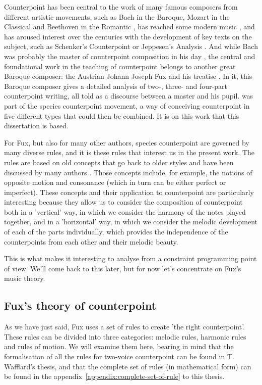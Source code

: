 Counterpoint has been central to the work of many famous composers from different artistic movements, such as Bach in the Baroque, Mozart in the Classical and Beethoven in the Romantic \cite{kramer1987gradus}, has reached some modern music \cite{altozano2017contrapunto}, and has aroused interest over the centuries with the development of key texts on the subject, such as Schenker's Counterpoint \cite{schenker1906} or Jeppesen's Analysis \cite{jeppesen1960}. And while Bach was probably the master of counterpoint composition in his day \cite{yearsley2002}, the central and foundational work in the teaching of counterpoint belongs to another great Baroque composer: the Austrian Johann Joseph Fux and his treatise \gap. In it, this Baroque composer gives a detailed analysis of two-, three- and four-part counterpoint writing, all told as a discourse between a master and his pupil. \gaps was part of the species counterpoint movement, a way of conceiving counterpoint in five different types that could then be combined. It is on this work that this dissertation is based.


For Fux, but also for many other authors, species counterpoint are governed by many diverse rules, and it is these rules that interest us in the present work. The rules are based on old concepts that go back to older styles and have been discussed by many authors \cite{crocker1962}.  Those concepts include, for example, the notions of opposite motion and consonance (which in turn can be either perfect or imperfect). These concepts and their application to counterpoint are particularly interesting because they allow us to consider the composition of counterpoint both in a 'vertical' way, in which we consider the harmony of the notes played together, and in a 'horizontal' way, in which we consider the melodic development of each of the parts individually, which provides the independence of the counterpoints from each other and their melodic beauty.

This is what makes it interesting to analyse from a constraint programming point of view. We'll come back to this later, but for now let's concentrate on Fux's music theory.

\subsection{Fux's theory of counterpoint}
As we have just said, Fux uses a set of rules to create 'the right counterpoint'. These rules can be divided into three categories: melodic rules, harmonic rules and rules of motion. We will examine them here, bearing in mind that the formalisation of all the rules for two-voice counterpoint can be found in T. Wafflard's thesis, and that the complete set of rules (in mathematical form) can be found in the appendix~\ref{appendix:complete-set-of-rule} to this thesis.


